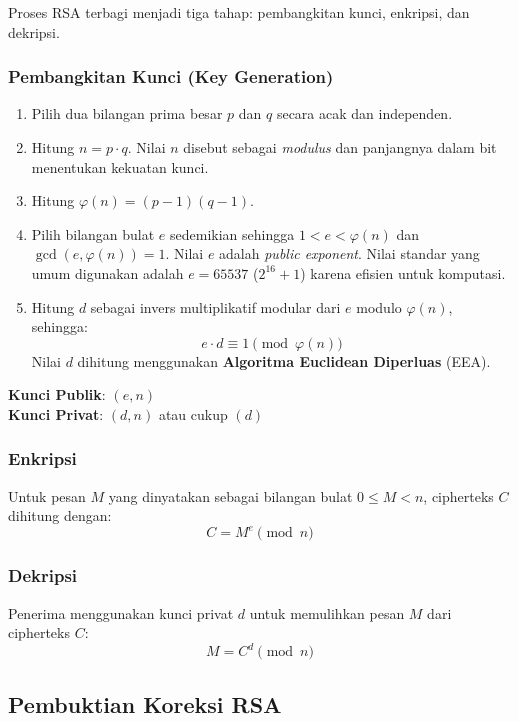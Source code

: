 Proses RSA terbagi menjadi tiga tahap: pembangkitan kunci, enkripsi, dan dekripsi.

\subsubsection{Pembangkitan Kunci (Key Generation)}
\begin{enumerate}
    \item Pilih dua bilangan prima besar $p$ dan $q$ secara acak dan independen.
    \item Hitung $n = p \cdot q$. Nilai $n$ disebut sebagai \textit{modulus} dan panjangnya dalam bit menentukan kekuatan kunci.
    \item Hitung $\varphi(n) = (p-1)(q-1)$.
    \item Pilih bilangan bulat $e$ sedemikian sehingga $1 < e < \varphi(n)$ dan $\gcd(e, \varphi(n)) = 1$. Nilai $e$ adalah \textit{public exponent}. Nilai standar yang umum digunakan adalah $e = 65537$ ($2^{16}+1$) karena efisien untuk komputasi.
    \item Hitung $d$ sebagai invers multiplikatif modular dari $e$ modulo $\varphi(n)$, sehingga:
    \begin{equation}
      e \cdot d \equiv 1 \pmod{\varphi(n)}
    \end{equation}
    Nilai $d$ dihitung menggunakan \textbf{Algoritma Euclidean Diperluas} (EEA).
\end{enumerate}
\textbf{Kunci Publik}: $(e, n)$ \\
\textbf{Kunci Privat}: $(d, n)$ atau cukup $(d)$

\subsubsection{Enkripsi}
Untuk pesan $M$ yang dinyatakan sebagai bilangan bulat $0 \le M < n$, cipherteks $C$ dihitung dengan:
\begin{equation}
  C = M^e \pmod{n}
\end{equation}

\subsubsection{Dekripsi}
Penerima menggunakan kunci privat $d$ untuk memulihkan pesan $M$ dari cipherteks $C$:
\begin{equation}
  M = C^d \pmod{n}
\end{equation}

\subsection{Pembuktian Koreksi RSA}

